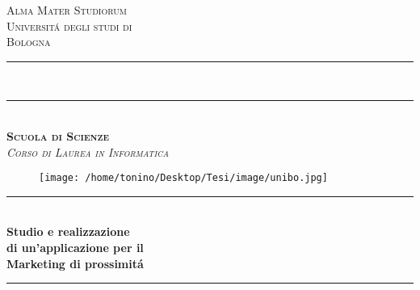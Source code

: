 \begin{titlepage}

\newcommand{\HRule}{\rule{\linewidth}{0.5mm}} %

\newcommand{\HRulea}{\rule{\linewidth}{0.5mm}} %

\newcommand{\HRuleb}{\rule{\linewidth}{0.7mm}} %

\newcommand{\newlecture}{%
  \clearpage
  \refstepcounter{lecture}%
  \noindent{\large\bfseries \lecturename{} \thelecture}%
  \par\bigskip\noindent\ignorespaces%
}

\renewcommand{\sectionmark}[1]{\markright{#1}}

\renewcommand{\familydefault}{\rmdefault}

\center %
 

\textsc{\LARGE Alma Mater Studiorum}\\[0.2cm] %
\textsc{\LARGE Universit\'a degli studi di}\\[0.2cm] %
\textsc{\LARGE Bologna}\\[0.1cm]
\HRulea \\[0.0cm]
\HRuleb \\[0.5cm]
\textsc {\textbf{\Large Scuola di Scienze}}\\[0.5cm] %
\textsc{\textit{\large Corso di Laurea in Informatica}}\\[0.5cm] %
\begin{figure}[h]
\texttt{[image: /home/tonino/Desktop/Tesi/image/unibo.jpg]}\centering
\end{figure}


\HRule \\[0.4cm]
{ \huge \bfseries Studio e realizzazione}\\[0.4cm] %
{ \huge \bfseries di un'applicazione per il}\\[0.4cm] %
{ \huge \bfseries Marketing di prossimit\'a}\\[0.4cm] %
\HRule \\[0.6cm]
 

\end{titlepage}
